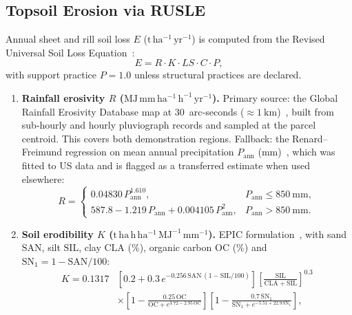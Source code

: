 \subsection{Topsoil Erosion via RUSLE}
Annual sheet and rill soil loss $E$ ($\mathrm{t\,ha^{-1}\,yr^{-1}}$) is computed from the Revised Universal Soil Loss Equation~\cite{renard1997rusle}:
\begin{equation}
  E = R \cdot K \cdot LS \cdot C \cdot P,
\end{equation}
with support practice $P = 1.0$ unless structural practices are declared.
\begin{enumerate}[leftmargin=1.5em]
  \item \textbf{Rainfall erosivity $R$ ($\mathrm{MJ\,mm\,ha^{-1}\,h^{-1}\,yr^{-1}}$).} Primary source: the Global Rainfall Erosivity Database map at 30~arc-seconds ($\approx 1~\mathrm{km}$)~\cite{panagos2017global}, built from sub-hourly and hourly pluviograph records and sampled at the parcel centroid. This covers both demonstration regions. Fallback: the Renard--Freimund regression on mean annual precipitation $P_{\mathrm{ann}}$ (mm)~\cite{renard1994using}, which was fitted to US data and is flagged as a transferred estimate when used elsewhere:
  \begin{equation}
    R =
    \begin{cases}
      0.04830 \, P_{\mathrm{ann}}^{1.610}, & P_{\mathrm{ann}} \le 850~\mathrm{mm}, \\
      587.8 - 1.219 \, P_{\mathrm{ann}} + 0.004105 \, P_{\mathrm{ann}}^{2}, & P_{\mathrm{ann}} > 850~\mathrm{mm}.
    \end{cases}
  \end{equation}
  \item \textbf{Soil erodibility $K$ ($\mathrm{t\,ha\,h\,ha^{-1}\,MJ^{-1}\,mm^{-1}}$).} EPIC formulation~\cite{williams1995epic}, with sand $\mathrm{SAN}$, silt $\mathrm{SIL}$, clay $\mathrm{CLA}$ (\%), organic carbon $\mathrm{OC}$ (\%) and $\mathrm{SN_1} = 1 - \mathrm{SAN}/100$:
  \begin{equation}
  \begin{aligned}
    K = 0.1317 &\left[0.2 + 0.3\, e^{-0.256\,\mathrm{SAN}\,(1 - \mathrm{SIL}/100)}\right]
    \left[\frac{\mathrm{SIL}}{\mathrm{CLA} + \mathrm{SIL}}\right]^{0.3} \\
    &\times \left[1 - \frac{0.25\,\mathrm{OC}}{\mathrm{OC} + e^{3.72 - 2.95\,\mathrm{OC}}}\right]
    \left[1 - \frac{0.7\,\mathrm{SN_1}}{\mathrm{SN_1} + e^{-5.51 + 22.9\,\mathrm{SN_1}}}\right],
  \end{aligned}

\end{equation}
\end{enumerate}
